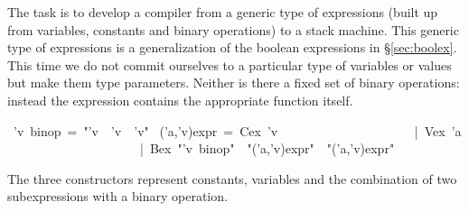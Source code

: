 \begin{isabelle}%
%
\begin{isamarkuptext}%
\noindent
The task is to develop a compiler from a generic type of expressions (built
up from variables, constants and binary operations) to a stack machine.  This
generic type of expressions is a generalization of the boolean expressions in
\S\ref{sec:boolex}.  This time we do not commit ourselves to a particular
type of variables or values but make them type parameters.  Neither is there
a fixed set of binary operations: instead the expression contains the
appropriate function itself.%
\end{isamarkuptext}%
~'v~binop~=~{"}'v~{\isasymRightarrow}~'v~{\isasymRightarrow}~'v{"}\isanewline
{}~('a,'v)expr~=~Cex~'v\isanewline
~~~~~~~~~~~~~~~~~~~~~|~Vex~'a\isanewline
~~~~~~~~~~~~~~~~~~~~~|~Bex~{"}'v~binop{"}~~{"}('a,'v)expr{"}~~{"}('a,'v)expr{"}%
\begin{isamarkuptext}%
\noindent
The three constructors represent constants, variables and the combination of
two subexpressions with a binary operation.


\end{isamarkuptext}
\end{isabelle}
